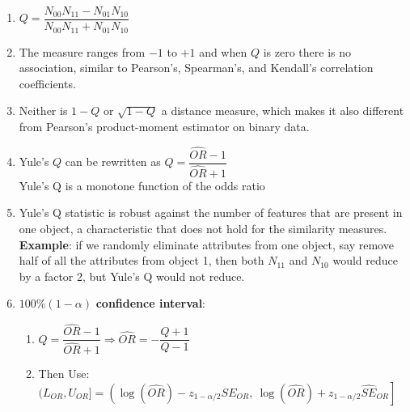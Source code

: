 \begin{enumerate}
    \item $ Q = \dfrac{N_{00} N_{11} - N_{01} N_{10}}{N_{00} N_{11} + N_{01} N_{10}} $
    \hfill \cite{statistics/book/Statistics-for-Data-Scientists/Maurits-Kaptein}

    \item The measure ranges from $-1$ to $+1$ and when $Q$ is zero there is no association, similar to Pearson’s, Spearman’s, and Kendall’s correlation coefficients.
    \hfill \cite{statistics/book/Statistics-for-Data-Scientists/Maurits-Kaptein}

    \item Neither is $1 - Q$ or $\sqrt{1 - Q}$ a distance measure, which makes it also different from Pearson’s product-moment estimator on binary data.
    \hfill \cite{statistics/book/Statistics-for-Data-Scientists/Maurits-Kaptein}

    \item Yule’s $Q$ can be rewritten as $ Q = \dfrac{\hat{OR} - 1}{\hat{OR} + 1} $
    \hfill \cite{statistics/book/Statistics-for-Data-Scientists/Maurits-Kaptein}
    \\[0.3cm]
    Yule’s Q is a monotone function of the odds ratio
    \hfill \cite{statistics/book/Statistics-for-Data-Scientists/Maurits-Kaptein}

    \item  Yule’s Q statistic is robust against the number of features that are present in one object, a characteristic that does not hold for the similarity measures.
    \textbf{Example}: if we randomly eliminate attributes from one object, say remove half of all the attributes from object 1, then both $N_{11}$ and $N_{10}$ would reduce by a factor 2, but Yule’s Q would not reduce.
    \hfill \cite{statistics/book/Statistics-for-Data-Scientists/Maurits-Kaptein}

    \item $100\%(1 - \alpha)$ \textbf{confidence interval}:
    \hfill \cite{statistics/book/Statistics-for-Data-Scientists/Maurits-Kaptein}
    \begin{enumerate}
        \item
        $
            Q = \dfrac{\hat{OR} - 1}{\hat{OR} + 1}
            \Longrightarrow
            \hat{OR} = - \dfrac{Q+1}{Q-1}
        $
        \hfill \cite{statistics/book/Statistics-for-Data-Scientists/Maurits-Kaptein}

        \item Then Use:
        $
            (L_{O R} , U_{O R} ] =
            \left(
                \log( \hat{OR}) - z_{1-\alpha/2} \hat{SE}_{OR} ,
                \ \log( \hat{OR}) + z_{1-\alpha/2} \hat{SE}_{OR}
            \right]
        $
        \hfill \cite{statistics/book/Statistics-for-Data-Scientists/Maurits-Kaptein}
    \end{enumerate}

\end{enumerate}





















